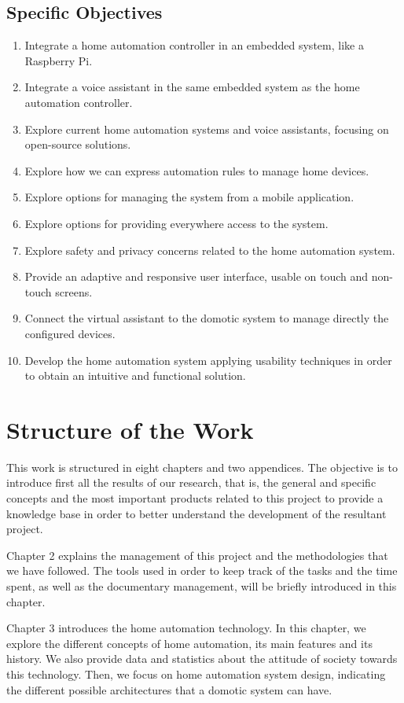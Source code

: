 \subsection{Specific Objectives}
\begin{enumerate}
	\item Integrate a home automation controller in an embedded system, like a Raspberry Pi.
	\item Integrate a voice assistant in the same embedded system as the home automation controller.
	\item Explore current home automation systems and voice assistants, focusing on open-source solutions.
	\item Explore how we can express automation rules to manage home devices.
	\item Explore options for managing the system from a mobile application.
	\item Explore options for providing everywhere access to the system.
	\item Explore safety and privacy concerns related to the home automation system.
	\item Provide an adaptive and responsive user interface, usable on touch and non-touch screens.
	\item Connect the virtual assistant to the domotic system to manage directly the configured devices.
	\item Develop the home automation system applying usability techniques in order to obtain an intuitive and functional solution.
\end{enumerate}

\bigskip
\section{Structure of the Work}
This work is structured in eight chapters and two appendices. The objective is to introduce first all the results of our research, 
that is, the general and specific concepts and the most important products related to this project to provide a knowledge base 
in order to better understand the development of the resultant project.

Chapter 2 explains the management of this project and the methodologies that we have followed. The tools used in order to keep track
of the tasks and the time spent, as well as the documentary management, will be briefly introduced in this chapter.

Chapter 3 introduces the home automation technology. In this chapter, we explore the different concepts of home automation,
its main features and its history. We also provide data and statistics about the attitude of society towards this technology. Then,
we focus on home automation system design, indicating the different possible architectures that a domotic system can have.

